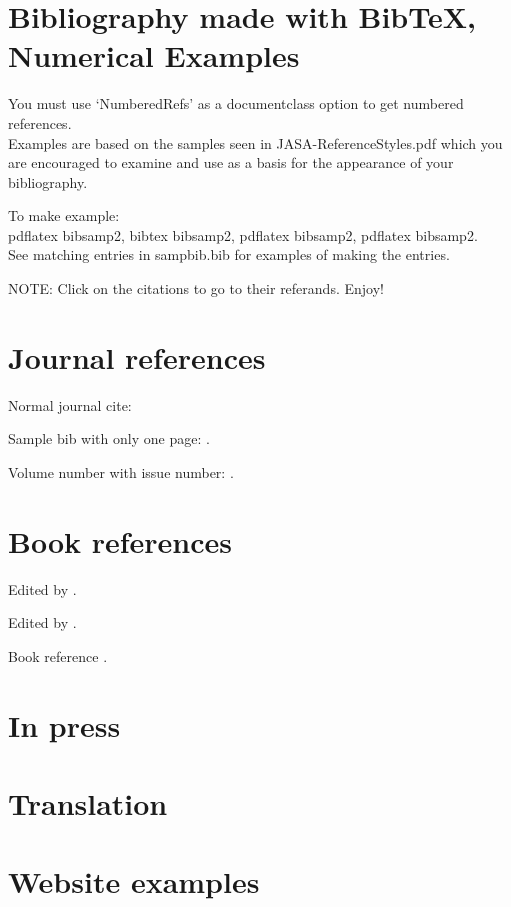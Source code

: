 \documentclass[NumberedRefs]{JASA-EL}
\begin{document}
\section*{Bibliography made with BibTeX, Numerical Examples}

You must use `NumberedRefs' as a documentclass option to get
numbered references.\\
Examples are based on the samples seen in JASA-ReferenceStyles.pdf which you
are encouraged to examine and use as a basis for the appearance of your bibliography.

To make example:\\
 pdflatex bibsamp2, bibtex bibsamp2, pdflatex bibsamp2, pdflatex
 bibsamp2.\\
 See matching entries in sampbib.bib for examples of making the entries.

NOTE: Click on the citations to go to their referands. Enjoy!

\section*{Journal references}

 Normal journal cite: \cite{joursamp1}

 Sample bib with only one page: \cite{joursamp2}.

 Volume number with issue number: \cite{yang}.


\section*{Book references}

Edited by \cite{sampincollection3}.

Edited by \cite{sampincollection4}.

Book reference \cite{booksamp1}.


\section*{In press}

\cite{inpress1,inpress2}

\cite{samponline}

\section*{Translation}

\cite{translation}

\section*{Website examples}
\end{document}
